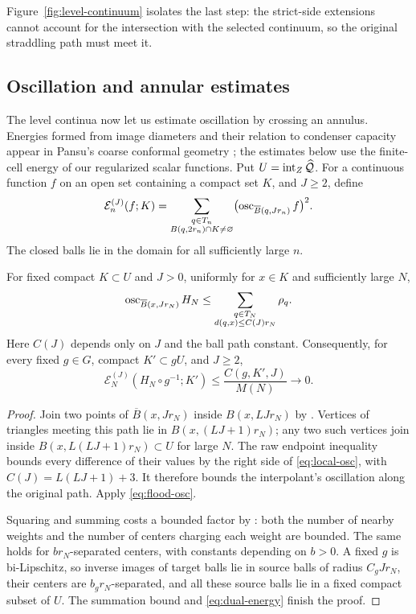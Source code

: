 Figure~\ref{fig:level-continuum} isolates the last step: the strict-side
extensions cannot account for the intersection with the selected
continuum, so the original straddling path must meet it.



\subsection{Oscillation and annular estimates}

The level continua now let us estimate oscillation by crossing an annulus.
Energies formed from image diameters and their relation to condenser
capacity appear in Pansu's coarse conformal geometry \cite[\S6]{Pansu1989};
the estimates below use the finite-cell energy of our regularized scalar
functions. Put $U=\operatorname{int}_Z\widehat{\mathcal Q}$. For a continuous function $f$ on
an open set containing a compact set $K$, and $J\geq2$, define
\[
 \mathcal E_n^{(J)}(f;K)=
 \sum_{\substack{q\in T_n\\B(q,2r_n)\cap K\ne\varnothing}}
       \bigl(\operatorname{osc}_{\overline B(q,Jr_n)}f\bigr)^2.
\]
The closed balls lie in the domain for all sufficiently large $n$.

\begin{lemma}
\label{lem:local-oscillation}
For fixed compact $K\subset U$ and $J>0$, uniformly for $x\in K$
and sufficiently large $N$,
\begin{equation}
 \operatorname{osc}_{\overline B(x,Jr_N)}H_N
 \leq\sum_{\substack{q\in T_N\\d(q,x)\leq C(J)r_N}}\rho_q.
 \label{eq:local-osc}
\end{equation}
Here $C(J)$ depends only on $J$ and the ball path constant.
Consequently, for every fixed $g\in G$, compact $K'\subset gU$,
and $J\geq2$,
\[
 \mathcal E_N^{(J)}(H_N\circ g^{-1};K')
       \leq\frac{C(g,K',J)}{M(N)}\longrightarrow0.
\]
\end{lemma}
\begin{proof}
Join two points of $\overline B(x,Jr_N)$ inside $B(x,LJr_N)$
by . Vertices of triangles meeting this path lie
in $B(x,(LJ+1)r_N)$; any two such vertices join inside
$B(x,L(LJ+1)r_N)\subset U$ for large $N$. The raw endpoint
inequality bounds every difference of their values by the right side
of \eqref{eq:local-osc}, with $C(J)=L(LJ+1)+3$. It therefore bounds
the interpolant's oscillation along the original path. Apply
\eqref{eq:flood-osc}.

Squaring and summing costs a bounded factor by :
both the number of nearby weights and the number of centers charging
each weight are bounded. The same holds for $br_N$-separated centers,
with constants depending on $b>0$. A fixed $g$ is bi-Lipschitz,
so inverse images of target balls lie in source balls of radius
$C_gJr_N$, their centers are $b_gr_N$-separated, and all these source
balls lie in a fixed compact subset of $U$. The summation bound and
\eqref{eq:dual-energy} finish the proof.
\end{proof}

